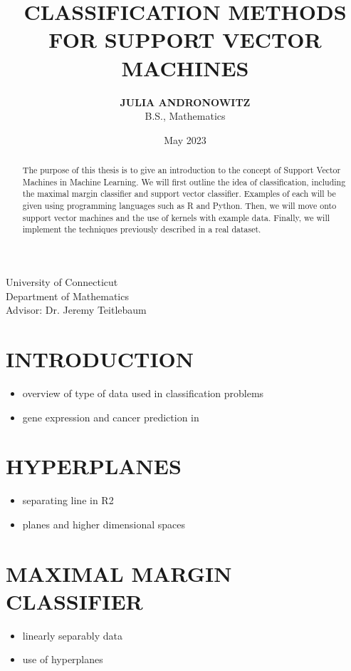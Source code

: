 \documentclass[12pt]{article}
\title{\textbf{CLASSIFICATION METHODS FOR SUPPORT VECTOR MACHINES}}
\author{\textbf{JULIA ANDRONOWITZ} \\ B.S., Mathematics}
\date{May 2023}
\begin{document}
\maketitle
\thispagestyle{empty}

\begin{adjustwidth}{0.5in}{0.5in}
\begin{abstract}
    The purpose of this thesis is to give an introduction to the concept of Support Vector Machines in Machine Learning. We will first outline the idea of classification, including the maximal margin classifier and support vector classifier. Examples of each will be given using programming languages such as R and Python. Then, we will move onto support vector machines and the use of kernels with example data. Finally, we will implement the techniques previously described in a real dataset.
\end{abstract}
\end{adjustwidth}

\vspace{175pt}

\begin{center}
    University of Connecticut \\ Department of Mathematics \\ Advisor: Dr. Jeremy Teitlebaum
\end{center}

\newpage

\section*{INTRODUCTION}
\begin{itemize}
    \item overview of type of data used in classification problems
    \item gene expression and cancer prediction in \citet{introstatlearning}
    \end{itemize}

\section*{HYPERPLANES}
\begin{itemize}
    \item separating line in R2
    \item planes and higher dimensional spaces
\end{itemize}


\section*{MAXIMAL MARGIN CLASSIFIER}
\begin{itemize}
    \item linearly separably data
    \item use of hyperplanes
\end{itemize}
\end{document}

